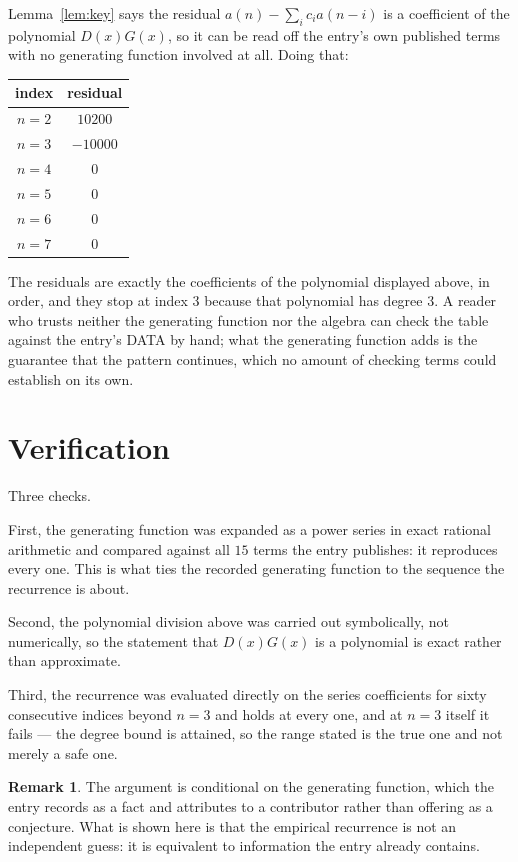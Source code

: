 \documentclass[11pt,a4paper]{article}
\theoremstyle{plain}
\theoremstyle{definition}
\newtheorem{remark}[theorem]{Remark}
\begin{document}
Lemma~\ref{lem:key} says the residual $a(n)-\sum_ic_ia(n-i)$ is a coefficient of the
polynomial $D(x)G(x)$, so it can be read off the entry's own published terms with no
generating function involved at all. Doing that:
\begin{center}
\begin{tabular}{cc}
index & residual \\ \hline
$n=2$ & $10200$ \\
$n=3$ & $-10000$ \\
$n=4$ & $0$ \\
$n=5$ & $0$ \\
$n=6$ & $0$ \\
$n=7$ & $0$
\end{tabular}
\end{center}
The residuals are exactly the coefficients of the polynomial displayed above, in order, and
they stop at index $3$ because that polynomial has degree $3$. A reader who trusts
neither the generating function nor the algebra can check the table against the entry's DATA
by hand; what the generating function adds is the guarantee that the pattern continues, which
no amount of checking terms could establish on its own.

\section{Verification}

Three checks.

First, the generating function was expanded as a power series in exact rational arithmetic and
compared against all $15$ terms the entry publishes: it reproduces every one. This is
what ties the recorded generating function to the sequence the recurrence is about.

Second, the polynomial division above was carried out symbolically, not numerically, so the
statement that $D(x)G(x)$ is a polynomial is exact rather than approximate.

Third, the recurrence was evaluated directly on the series coefficients for sixty consecutive
indices beyond $n=3$ and holds at every one, and at $n=3$ itself it fails --- the
degree bound is attained, so the range stated is the true one and not merely a safe one.

\begin{remark}
The argument is conditional on the generating function, which the entry records as a fact and
attributes to a contributor rather than offering as a conjecture. What is shown here is that
the empirical recurrence is not an independent guess: it is equivalent to information the
entry already contains.
\end{remark}
\end{document}
